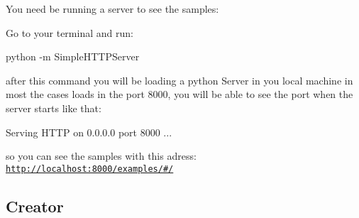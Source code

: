 You need be running a server to see the samples\+:

Go to your terminal and run\+:


\begin{DoxyCode}
python -m SimpleHTTPServer
\end{DoxyCode}
 after this command you will be loading a python Server in you local machine in most the cases loads in the port 8000, you will be able to see the port when the server starts like that\+: 
\begin{DoxyCode}
Serving HTTP on 0.0.0.0 port 8000 ...
\end{DoxyCode}


so you can see the samples with this adress\+: \href{http://localhost:8000/examples/#/}{\tt http\+://localhost\+:8000/examples/\#/}

\subsection*{Creator}